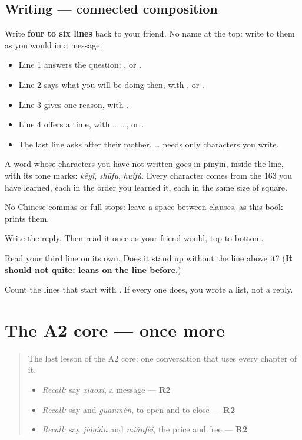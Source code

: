 \subsection*{Writing — connected composition}
Write \textbf{four to six lines} back to your friend. No name at the top: write to them as you would in a message.

\begin{itemize}
\raggedright
  \item Line 1 answers the question: , or .
  \item Line 2 says what you will be doing then, with ,  or .
  \item Line 3 gives one reason, with .
  \item Line 4 offers a time, with  …  …, or .
  \item The last line asks after their mother.  … needs only characters you write.
\end{itemize}

A word whose characters you have not written goes in pinyin, inside the line, with its tone marks: \emph{kěyǐ}, \emph{shūfu}, \emph{huífù}. Every character comes from the 163 you have learned, each in the order you learned it, each in the same size of square.

No Chinese commas or full stops: leave a space between clauses, as this book prints them.

Write the reply. Then read it once as your friend would, top to bottom.

\begin{tcolorbox}[breakable,colback=teal!4,colframe=teal!35!black,title={Before you move on}]
Read your third line on its own. Does it stand up without the line above it? (\textbf{It should not quite:  leans on the line before}.)

Count the lines that start with . If every one does, you wrote a list, not a reply.
\end{tcolorbox}
\section[(dialogue)]{The A2 core — once more}

\label{lesson:ZH-R157-review-final-157}



\begin{quote}
The last lesson of the A2 core: one conversation that uses every chapter of it.

\begin{itemize}
\raggedright
  \item \emph{Recall:} say \emph{xiāoxi}, a message — \textbf{R2}
  \item \emph{Recall:} say  and \emph{guānmén}, to open and to close — \textbf{R2}
  \item \emph{Recall:} say \emph{jiàqián} and \emph{miǎnfèi}, the price and free — \textbf{R2}
\end{itemize}
\end{quote}

